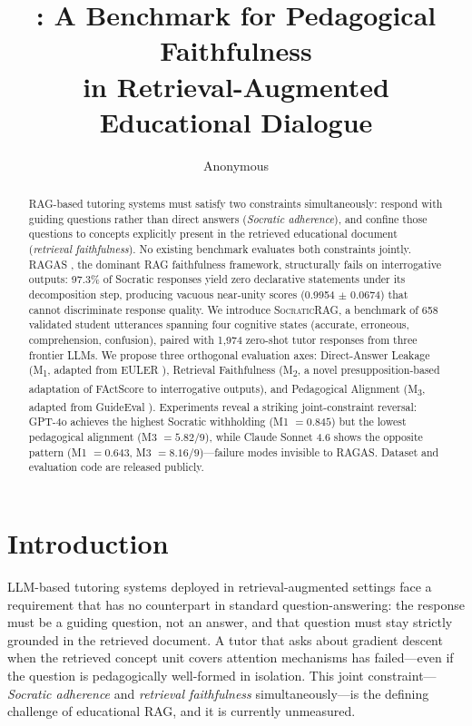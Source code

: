 \documentclass[11pt]{article}
\title{\ours: A Benchmark for Pedagogical Faithfulness\\
       in Retrieval-Augmented Educational Dialogue}
\author{Anonymous}
\newcommand{\ours}{\textsc{SocraticRAG}\xspace}
\newcommand{\mtwo}{M\textsubscript{2}\xspace}
\newcommand{\mone}{M\textsubscript{1}\xspace}
\newcommand{\mthree}{M\textsubscript{3}\xspace}
\begin{document}
\maketitle

\begin{abstract}

RAG-based tutoring systems must satisfy two constraints simultaneously:
respond with guiding questions rather than direct answers
(\textit{Socratic adherence}), and confine those questions to concepts
explicitly present in the retrieved educational document
(\textit{retrieval faithfulness}).
No existing benchmark evaluates both constraints jointly.
RAGAS \citep{es2024ragas}, the dominant RAG faithfulness framework,
structurally fails on interrogative outputs: 97.3\% of Socratic responses
yield zero declarative statements under its decomposition step, producing
vacuous near-unity scores (0.9954 $\pm$ 0.0674) that cannot discriminate
response quality.
We introduce \ours, a benchmark of 658 validated student utterances
spanning four cognitive states (accurate, erroneous, comprehension,
confusion), paired with 1{,}974 zero-shot tutor responses from three
frontier LLMs.
We propose three orthogonal evaluation axes:
Direct-Answer Leakage (\mone, adapted from EULER \citep{bonino2024euler}),
Retrieval Faithfulness (\mtwo, a novel presupposition-based adaptation of
FActScore \citep{min2023factscore} to interrogative outputs), and
Pedagogical Alignment (\mthree, adapted from
GuideEval \citep{liuy2025discerning}).
Experiments reveal a striking joint-constraint reversal: GPT-4o achieves
the highest Socratic withholding (M1 $= 0.845$) but the lowest pedagogical
alignment (M3 $= 5.82/9$), while Claude Sonnet 4.6 shows the opposite
pattern (M1 $= 0.643$, M3 $= 8.16/9$)---failure modes invisible to RAGAS.
Dataset and evaluation code are released publicly.

\end{abstract}

\section{Introduction}

LLM-based tutoring systems deployed in retrieval-augmented settings face
a requirement that has no counterpart in standard question-answering:
the response must be a guiding question, not an answer, and that question
must stay strictly grounded in the retrieved document.
A tutor that asks about gradient descent when the retrieved concept unit
covers attention mechanisms has failed---even if the question is
pedagogically well-formed in isolation.
This joint constraint---\textit{Socratic adherence} and
\textit{retrieval faithfulness} simultaneously---is the defining challenge
of educational RAG, and it is currently unmeasured.
\end{document}
